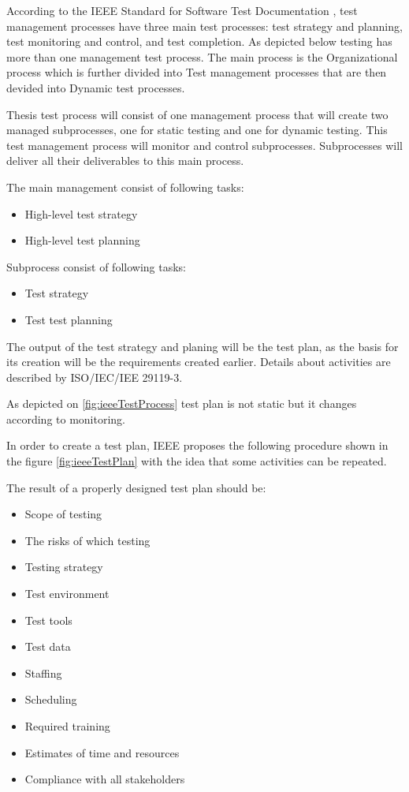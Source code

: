 According to the IEEE Standard for Software Test Documentation \cite{ieeeTestProcess}, test management processes have three main test processes: test strategy and planning, test monitoring and control, and test completion.
As depicted below testing has more than one management test process. The main process is the Organizational process which is further divided into Test management processes that are then devided into Dynamic test processes.


Thesis test process will consist of one management process that will create two managed subprocesses, one for static testing and one for dynamic testing. This test management process will monitor and control subprocesses. Subprocesses will deliver all their deliverables to this main process.

The main management consist of following tasks:
\begin{itemize}
  \item High-level test strategy
  \item High-level test planning
\end{itemize}

Subprocess consist of following tasks:
\begin{itemize}
  \item Test strategy
  \item Test test planning
\end{itemize}

The output of the test strategy and planing will be the test plan, as the basis for its creation will be the requirements created earlier. Details about activities are described by ISO/IEC/IEE 29119-3.

As depicted on \ref{fig:ieeeTestProcess} test plan is not static but it changes according to monitoring.


In order to create a test plan, IEEE proposes the following procedure shown in the figure \ref{fig:ieeeTestPlan} with the idea that some activities can be repeated.

The result of a properly designed test plan should be:
\begin{itemize}
  \item Scope of testing
  \item The risks of which testing
  \item Testing strategy
  \item Test environment
  \item Test tools
  \item Test data
  \item Staffing
  \item Scheduling
  \item Required training
  \item Estimates of time and resources
  \item Compliance with all stakeholders
\end{itemize}

